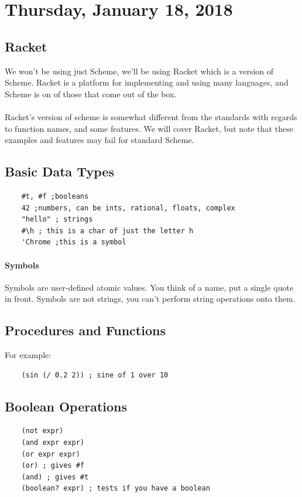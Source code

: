 \documentclass[12pt]{article}
\begin{document}
\section{Thursday, January 18, 2018}

\subsection{Racket}

We won't be using just Scheme, we'll be using Racket which is a version of Scheme. Racket is a platform for implementing and using many languages, and Scheme is on of those that come out of the box.\\
\\
Racket's version of scheme is somewhat different from the standards with regards to function names, and some features. We will cover Racket, but note that these examples and features may fail for standard Scheme.

\subsection{Basic Data Types}

\begin{lstlisting}
    #t, #f ;booleans
    42 ;numbers, can be ints, rational, floats, complex
    "hello" ; strings
    #\h ; this is a char of just the letter h
    'Chrome ;this is a symbol
\end{lstlisting}

\paragraph{Symbols} Symbols are user-defined atomic values. You think of a name, put a single quote in front. Symbols are not strings, you can't perform string operations onto them.

\subsection{Procedures and Functions}
For example:
\begin{lstlisting}
    (sin (/ 0.2 2)) ; sine of 1 over 10
\end{lstlisting}

\subsection{Boolean Operations}

\begin{lstlisting}
    (not expr)
    (and expr expr)
    (or expr expr)
    (or) ; gives #f
    (and) ; gives #t
    (boolean? expr) ; tests if you have a boolean
\end{lstlisting}
\end{document}
